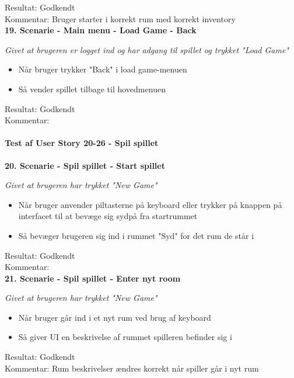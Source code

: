 Resultat: Godkendt\\
Kommentar: Bruger starter i korrekt rum med korrekt inventory\\

\textbf{19. Scenarie - Main menu - Load Game - Back}

\textit{Givet at brugeren er logget ind og har adgang til spillet og trykket "Load Game"}

\begin{itemize}
  \item Når bruger trykker "Back" i load game-menuen
  \item Så vender spillet tilbage til hovedmenuen
\end{itemize}

Resultat: Godkendt\\
Kommentar:\\

\paragraph{Test af User Story 20-26 - Spil spillet}

\textbf{20. Scenarie - Spil spillet - Start spillet}

\textit{Givet at brugeren har trykket "New Game"}

\begin{itemize}
  \item Når bruger anvender piltasterne på keyboard eller trykker på knappen på interfacet til at bevæge sig sydpå fra startrummet
  \item Så bevæger brugeren sig ind i rummet "Syd" for det rum de står i
\end{itemize}

Resultat: Godkendt\\
Kommentar:\\

\textbf{21. Scenarie - Spil spillet - Enter nyt room}

\textit{Givet at brugeren har trykket "New Game"}

\begin{itemize}
  \item Når bruger går ind i et nyt rum ved brug af keyboard
  \item Så giver UI en beskrivelse af rummet spilleren befinder sig i
\end{itemize}

Resultat: Godkendt\\
Kommentar: Rum beskrivelser ændres korrekt når spiller går i nyt rum\\

